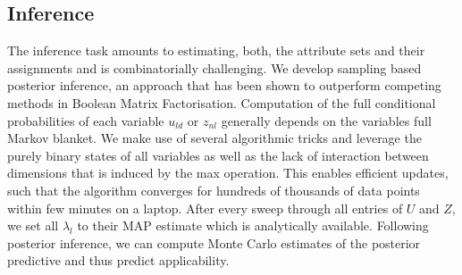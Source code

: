 \documentclass{article}
\begin{document}
\subsection{Inference}
\label{sec:orge79dcef}
The inference task amounts to estimating, both, the attribute sets
and their assignments and is combinatorially challenging.
We develop sampling based posterior inference, an approach that
has been shown to outperform competing methods in Boolean Matrix
Factorisation\space{}\cite{Rukat2017}. Computation of the full
conditional probabilities of each variable \(u_{ld}\) or \(z_{nl}\)
generally depends on the variables full Markov blanket. We make use
of several
algorithmic tricks and leverage the purely binary states of all
variables as well as the lack of interaction between dimensions that is
induced by the max operation. This enables efficient updates, such that
the algorithm converges for hundreds of thousands of data points
within few minutes on a laptop. After every sweep through all entries of $U$ and $Z$, we set
all $\lambda_l$ to their MAP estimate which is analytically available.
Following posterior inference, we can compute Monte Carlo estimates
of the posterior predictive and thus predict applicability.



\end{document}
